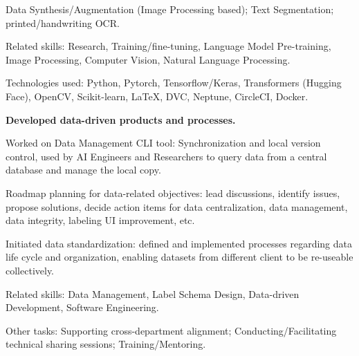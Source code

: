 \begin{xitemize}
\begin{zitemize}
        Data Synthesis/Augmentation (Image Processing based); Text Segmentation;
        printed/handwriting OCR.
        \item Related skills: Research, Training/fine-tuning, Language Model Pre-training, Image Processing, Computer Vision, Natural Language Processing.
        \item Technologies used: Python, Pytorch, Tensorflow/Keras, Transformers (Hugging Face),
        OpenCV, Scikit-learn, \LaTeX, DVC, Neptune, CircleCI, Docker.
    \end{zitemize}
    \item \textbf{Developed data-driven products and processes.}
    \begin{zitemize}
        \item Worked on Data Management CLI tool: Synchronization and local version control, used by AI Engineers and Researchers to query data from a central database and manage the local copy.
        \item Roadmap planning for data-related objectives: lead discussions, identify issues, propose solutions, decide action items for data centralization, data management, data integrity, labeling UI improvement, etc.
        \item Initiated data standardization: defined and implemented processes regarding data life cycle and organization, enabling datasets from different client to be re-useable collectively.
        \item Related skills: Data Management, Label Schema Design, Data-driven Development, Software Engineering.
    \end{zitemize}
    \item Other tasks: Supporting cross-department alignment; Conducting/Facilitating technical sharing sessions; Training/Mentoring.
\end{xitemize}

